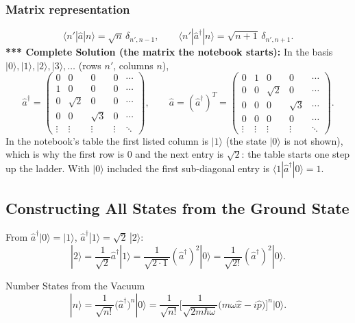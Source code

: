 \documentclass[11pt,a4paper]{article}
\begin{document}
\subsubsection*{Matrix representation}
\[
\langle n'|\hat a|n\rangle=\sqrt n\,\delta_{n',n-1},\qquad \langle n'|\hat a^\dagger|n\rangle=\sqrt{n+1}\,\delta_{n',n+1}.
\]
\textbf{*** Complete Solution (the matrix the notebook starts):} In the basis $|0\rangle,|1\rangle,|2\rangle,|3\rangle,\dots$ (rows $n'$, columns $n$),
\[
\hat a^\dagger=\begin{pmatrix}0&0&0&0&\cdots\\ 1&0&0&0&\cdots\\ 0&\sqrt2&0&0&\cdots\\ 0&0&\sqrt3&0&\cdots\\ \vdots&\vdots&\vdots&\vdots&\ddots\end{pmatrix},\qquad
\hat a=(\hat a^\dagger)^T=\begin{pmatrix}0&1&0&0&\cdots\\ 0&0&\sqrt2&0&\cdots\\ 0&0&0&\sqrt3&\cdots\\ 0&0&0&0&\cdots\\ \vdots&\vdots&\vdots&\vdots&\ddots\end{pmatrix}.
\]
In the notebook's table the first listed column is $|1\rangle$ (the state $|0\rangle$ is not shown), which is why the first row is $0$ and the next entry is $\sqrt2$: the table starts one step up the ladder. With $|0\rangle$ included the first sub-diagonal entry is $\langle1|\hat a^\dagger|0\rangle=1$.

\subsection{Constructing All States from the Ground State}
From $\hat a^\dagger|0\rangle=|1\rangle$, $\hat a^\dagger|1\rangle=\sqrt2\,|2\rangle$:
\[
|2\rangle=\frac1{\sqrt2}\hat a^\dagger|1\rangle=\frac1{\sqrt{2\cdot1}}(\hat a^\dagger)^2|0\rangle=\frac1{\sqrt{2!}}(\hat a^\dagger)^2|0\rangle .
\]
\begin{thm}{Number States from the Vacuum}
\[
|n\rangle=\frac1{\sqrt{n!}}\big(\hat a^\dagger\big)^n|0\rangle=\frac1{\sqrt{n!}}\Big[\frac1{\sqrt{2m\hbar\omega}}\big(m\omega\hat x-i\hat p\big)\Big]^n|0\rangle .
\]
\end{thm}
\end{document}
